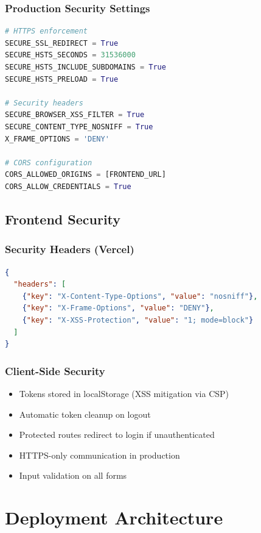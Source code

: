 \documentclass[11pt,a4paper]{article}
\begin{document}
\subsubsection{Production Security Settings}
\begin{lstlisting}[language=Python]
# HTTPS enforcement
SECURE_SSL_REDIRECT = True
SECURE_HSTS_SECONDS = 31536000
SECURE_HSTS_INCLUDE_SUBDOMAINS = True
SECURE_HSTS_PRELOAD = True

# Security headers
SECURE_BROWSER_XSS_FILTER = True
SECURE_CONTENT_TYPE_NOSNIFF = True
X_FRAME_OPTIONS = 'DENY'

# CORS configuration
CORS_ALLOWED_ORIGINS = [FRONTEND_URL]
CORS_ALLOW_CREDENTIALS = True
\end{lstlisting}

\subsection{Frontend Security}

\subsubsection{Security Headers (Vercel)}
\begin{lstlisting}[language=JSON]
{
  "headers": [
    {"key": "X-Content-Type-Options", "value": "nosniff"},
    {"key": "X-Frame-Options", "value": "DENY"},
    {"key": "X-XSS-Protection", "value": "1; mode=block"}
  ]
}
\end{lstlisting}

\subsubsection{Client-Side Security}
\begin{itemize}[leftmargin=*]
    \item Tokens stored in localStorage (XSS mitigation via CSP)
    \item Automatic token cleanup on logout
    \item Protected routes redirect to login if unauthenticated
    \item HTTPS-only communication in production
    \item Input validation on all forms
\end{itemize}

\section{Deployment Architecture}
\end{document}
